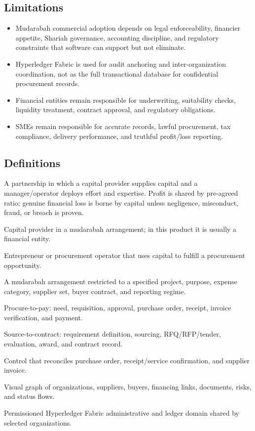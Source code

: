 \documentclass[11pt,a4paper]{article}
\begin{document}
\subsection{Limitations}
\begin{itemize}
  \item Mudarabah commercial adoption depends on legal enforceability, financier appetite, Shariah governance, accounting discipline, and regulatory constraints that software can support but not eliminate.
  \item Hyperledger Fabric is used for audit anchoring and inter-organization coordination, not as the full transactional database for confidential procurement records.
  \item Financial entities remain responsible for underwriting, suitability checks, liquidity treatment, contract approval, and regulatory obligations.
  \item SMEs remain responsible for accurate records, lawful procurement, tax compliance, delivery performance, and truthful profit/loss reporting.
\end{itemize}

\subsection{Definitions}
\begin{description}[leftmargin=4.2cm, style=nextline]
  \item[Mudarabah] A partnership in which a capital provider supplies capital and a manager/operator deploys effort and expertise. Profit is shared by pre-agreed ratio; genuine financial loss is borne by capital unless negligence, misconduct, fraud, or breach is proven.
  \item[Rabb-ul-Mal] Capital provider in a mudarabah arrangement; in this product it is usually a financial entity.
  \item[Mudarib] Entrepreneur or procurement operator that uses capital to fulfill a procurement opportunity.
  \item[Restricted mudarabah] A mudarabah arrangement restricted to a specified project, purpose, expense category, supplier set, buyer contract, and reporting regime.
  \item[P2P] Procure-to-pay: need, requisition, approval, purchase order, receipt, invoice verification, and payment.
  \item[S2C] Source-to-contract: requirement definition, sourcing, RFQ/RFP/tender, evaluation, award, and contract record.
  \item[Three-way match] Control that reconciles purchase order, receipt/service confirmation, and supplier invoice.
  \item[Network canvas] Visual graph of organizations, suppliers, buyers, financing links, documents, risks, and status flows.
  \item[Fabric channel] Permissioned Hyperledger Fabric administrative and ledger domain shared by selected organizations.
\end{description}
\end{document}
